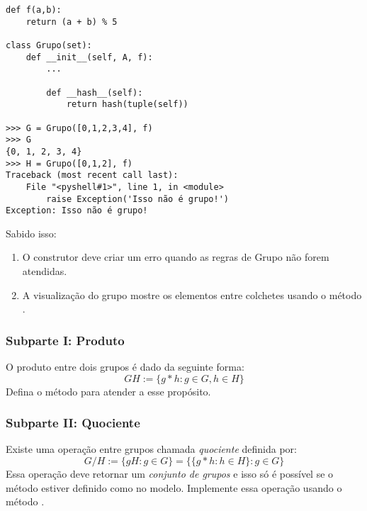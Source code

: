 \documentclass[12pt]{article}
\begin{document}
	\begin{lstlisting}
def f(a,b):
    return (a + b) % 5
    
class Grupo(set):
    def __init__(self, A, f):
        ...

	    def __hash__(self):
        	return hash(tuple(self))
        
>>> G = Grupo([0,1,2,3,4], f)
>>> G
{0, 1, 2, 3, 4}
>>> H = Grupo([0,1,2], f)
Traceback (most recent call last):
    File "<pyshell#1>", line 1, in <module>
        raise Exception('Isso não é grupo!')
Exception: Isso não é grupo!
	\end{lstlisting}
	
	Sabido isso:
	\begin{enumerate}
		\item O construtor deve criar um erro quando as regras de Grupo não forem atendidas.
		\item A visualização do grupo mostre os elementos entre colchetes usando o método .
	\end{enumerate}

	\subsubsection{Subparte I: Produto}
	O produto entre dois grupos é dado da seguinte forma:
	\[GH := \{g \ast h : g \in G, h\in H\} \]
	Defina o método  para atender a esse propósito.
	
	\subsubsection{Subparte II: Quociente}
	Existe uma operação entre grupos chamada \emph{quociente} definida por:
	\[G/H := \{gH : g \in G\} = \{\{g \ast h: h \in H\} : g \in G\}\]
	Essa operação deve retornar um \emph{conjunto de grupos} e isso só é possível se o método  estiver definido como no modelo. Implemente essa operação usando o método .
	
\end{document}
